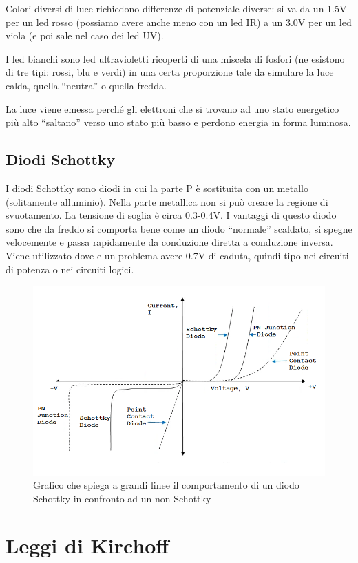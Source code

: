 \documentclass[
]{book}
\begin{document}
Colori diversi di luce richiedono differenze di potenziale diverse: si
va da un 1.5V per un led rosso (possiamo avere anche meno con un led IR)
a un 3.0V per un led viola (e poi sale nel caso dei led UV).

I led bianchi sono led ultravioletti ricoperti di una miscela di fosfori
(ne esistono di tre tipi: rossi, blu e verdi) in una certa proporzione
tale da simulare la luce calda, quella ``neutra'' o quella fredda.

La luce viene emessa perché gli elettroni che si trovano ad uno stato
energetico più alto ``saltano'' verso uno stato più basso e perdono
energia in forma luminosa.

\subsection{Diodi Schottky}\label{diodi-schottky}

I diodi Schottky sono diodi in cui la parte P è sostituita con un
metallo (solitamente alluminio). Nella parte metallica non si può creare
la regione di svuotamento. La tensione di soglia è circa 0.3-0.4V. I
vantaggi di questo diodo sono che da freddo si comporta bene come un
diodo ``normale'' scaldato, si spegne velocemente e passa rapidamente da
conduzione diretta a conduzione inversa. \newline Viene utilizzato dove
e un problema avere 0.7V di caduta, quindi tipo nei circuiti di potenza
o nei circuiti logici.

\begin{figure}
\centering
\includegraphics[width=0.5\linewidth,height=\textheight,keepaspectratio]{immagini/6.png}
\caption{Grafico che spiega a grandi linee il comportamento di un diodo
Schottky in confronto ad un non Schottky}
\end{figure}

\section{Leggi di Kirchoff}\label{leggi-di-kirchoff}
\end{document}

